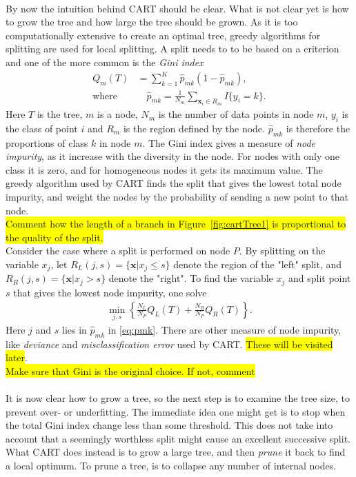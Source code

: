%
\\
By now the intuition behind CART should be clear. What is not clear yet is how to grow the tree and how large the tree should be grown. As it is too computationally extensive to create an optimal tree, greedy algorithms for splitting are used for local splitting. A split needs to to be based on a criterion and one of the more common is the \textit{Gini index}
\begin{align}
  Q_m(T) &= \sum^{K}_{k=1} \hat{p}_{mk} (1 - \hat{p}_{mk}),  \\ 
  \label{eq:pmk} 
  \text{where}& \quad \hat{p}_{mk} = \frac{1}{N_m} \sum_{\mathbf{x}_i \in R_m} I\{y_i = k\}.
\end{align}
Here $T$ is the tree, $m$ is a node, $N_m$ is the number of data points in node $m$, $y_i$ is the class of point $i$ and $R_m$ is the region defined by the node.
$\hat{p}_{mk}$ is therefore the proportions of class $k$ in node $m$.
The Gini index gives a measure of \textit{node impurity}, as it increase with the diversity in the node. For nodes with only one class it is zero, and for homogeneous nodes it gets its maximum value. The greedy algorithm used by CART finds the split that gives the lowest total node impurity, and weight the nodes by the probability of sending a new point to that node.   
\\ \colorbox{yellow}{Comment how the length of a branch in Figure~\ref{fig:cartTree1} is proportional to the quality of the split.} \\ 
Consider the case where a split is performed on node $P$. By splitting on the variable $x_j$, let $R_L(j,s) = \{\mathbf{x} | x_j \leq s\}$ denote the region of the "left" split,  and $R_R(j,s) = \{\mathbf{x} | x_j > s\}$ denote the "right". To find the variable $x_j$ and split point $s$ that gives the lowest node impurity, one solve
\begin{align}
  \min_{j,s} \left\{ \frac{N_L}{N_P} Q_L(T)
  + \frac{N_R}{N_P} Q_R(T) \right\}.
\end{align}
Here $j$ and $s$ lies in $\hat{p}_{mk}$ in \eqref{eq:pmk}.
There are other measure of node impurity, like \textit{deviance} and \textit{misclassification error} used by CART. \colorbox{yellow}{These will be visited later}.\\
\colorbox{yellow}{Make sure that Gini is the original choice. If not, comment} \\
\\
It is now clear how to grow a tree, so the next step is to examine the tree size, to prevent over- or underfitting. The immediate idea one might get is to stop when the total Gini index change less than some threshold. This does not take into account that a seemingly worthless split might cause an excellent successive split. 
What CART does instead is to grow a large tree, and then \textit{prune} it back to find a local optimum. To prune a tree, is to collapse any number of internal nodes. 

